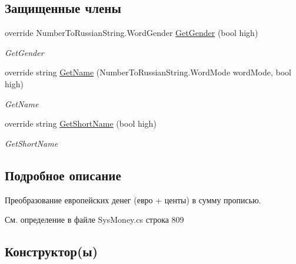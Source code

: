 \subsection*{Защищенные члены}
\begin{DoxyCompactItemize}
\item 
override Number\+To\+Russian\+String.\+Word\+Gender \mbox{\hyperlink{class_f_b_a_1_1_e_u_r_o_to_string_provider_af9419bfa6061d5c07378c09d95fb477d}{Get\+Gender}} (bool high)
\begin{DoxyCompactList}\small\item\em Get\+Gender \end{DoxyCompactList}\item 
override string \mbox{\hyperlink{class_f_b_a_1_1_e_u_r_o_to_string_provider_a78caf5a60ff7d1db427ce8cc376ebf31}{Get\+Name}} (Number\+To\+Russian\+String.\+Word\+Mode word\+Mode, bool high)
\begin{DoxyCompactList}\small\item\em Get\+Name \end{DoxyCompactList}\item 
override string \mbox{\hyperlink{class_f_b_a_1_1_e_u_r_o_to_string_provider_a7823c1debfb91be0eb7d995140d7af33}{Get\+Short\+Name}} (bool high)
\begin{DoxyCompactList}\small\item\em Get\+Short\+Name \end{DoxyCompactList}\end{DoxyCompactItemize}


\subsection{Подробное описание}
Преобразование европейских денег (евро + центы) в сумму прописью. 



См. определение в файле Sys\+Money.\+cs строка 809



\subsection{Конструктор(ы)}
\mbox{\label{class_f_b_a_1_1_e_u_r_o_to_string_provider_a776ee86ca928d01b03d8501e0d40d4a9}} 
